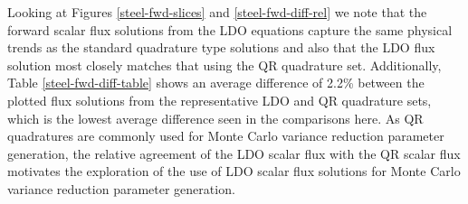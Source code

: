 \documentclass{article} %
\begin{document}
Looking at Figures \ref{steel-fwd-slices} and \ref{steel-fwd-diff-rel} we note
that the forward scalar flux solutions from the LDO equations capture the same
physical trends as the standard quadrature type solutions and also that the LDO
flux solution most closely matches that using the QR quadrature set.
Additionally, Table \ref{steel-fwd-diff-table} shows an average difference of
2.2\% between the plotted flux solutions from the representative LDO and QR
quadrature sets, which is the lowest average difference seen in the comparisons
here. As QR quadratures are commonly used for Monte Carlo variance reduction
parameter generation, the relative agreement of the LDO scalar flux with the QR
scalar flux motivates the exploration of the use of LDO scalar flux solutions
for Monte Carlo variance reduction parameter generation.
\end{document}
